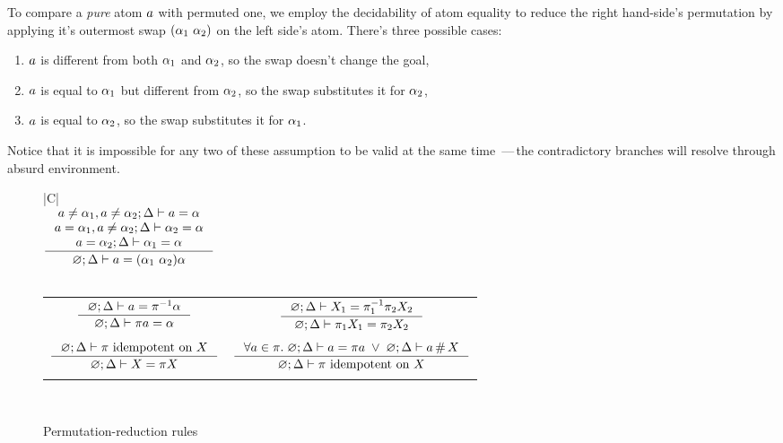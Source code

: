 \documentclass[english, mgr]{iithesis}
\renewcommand{\it}[1]{\textit{#1}}
\newcommand{\solverRule}{\vdash}
\newcommand{\mdash}{\,---\,}
\def\-{{\mdash}}
\begin{document}
To compare a \it{pure} atom $a$ with permuted one, we employ the decidability of atom equality
to reduce the right hand-side's permutation by applying it's outermost swap $(\alpha_1\ \alpha_2)$ on the left side's atom.
There's three possible cases: \begin{enumerate}[noitemsep]
    \item $a$ is different from both $\alpha_1$ and $\alpha_2$,
so the swap doesn't change the goal,
    \item $a$ is equal to $\alpha_1$ but different from $\alpha_2$,
so the swap substitutes it for $\alpha_2$,
    \item $a$ is equal to $\alpha_2$,
so the swap substitutes it for $\alpha_1$.
\end{enumerate}
Notice that it is impossible for any two of these assumption to be valid at the same time
\-the contradictory branches will resolve through absurd environment.
\begin{figure}[htbp]
    \centering
    \begin{tabularx}{\textwidth}{|C|}
      \hline \\ $
      \inference{
        \atomv \cneq \atomexp_1, \atomv \cneq \atomexp_2 ; \icEnv \solverRule \atomv     = \atomexp \\
        \atomv \ceq  \atomexp_1, \atomv \cneq \atomexp_2 ; \icEnv \solverRule \atomexp_2 = \atomexp \\
        \atomv \ceq  \atomexp_2 ; \icEnv \solverRule \atomexp_1 = \atomexp
      }{
        \emptyenv ; \icEnv \solverRule \atomv = \permswap{\atomexp_1}{\atomexp_2}{\atomexp}
      }
      $ \\ \\
    \begin{tabular}{cc}
      $
      \inference{
        \emptyenv ; \icEnv \solverRule \atomv = \perm^{-1} \atomexp
      }{
        \emptyenv ; \icEnv \solverRule \perm \atomv = \atomexp
      }
      $ & $
      \inference{
        \emptyenv ; \icEnv \solverRule \termv_1 = \pi_1^{-1} \pi_2 \termv_2
      }{
        \emptyenv ; \icEnv \solverRule \pi_1 \termv_1 = \pi_2 \termv_2
      }
      $ \\ & \\
      $
      \inference{
        \emptyenv ; \icEnv \solverRule \pi \text{ idempotent on } \termv
      }{
        \emptyenv ; \icEnv \solverRule \termv = \pi \termv
      }
      $ & $
      \inference{
        \forall \atomv \in \pi.\;
          \emptyenv ; \icEnv \solverRule \atomv = \pi \atomv \;\vee\;
          \emptyenv ; \icEnv \solverRule \atomv \cfresh \termv
        }{
        \emptyenv ; \icEnv \solverRule \pi \text{ idempotent on } \termv
      }
      $ \\ & \\
    \end{tabular} \\
    \hline
    \end{tabularx}
  \caption{Permutation-reduction rules}
  \label{fig:permutation-reduction-rules}
\end{figure}
\end{document}
